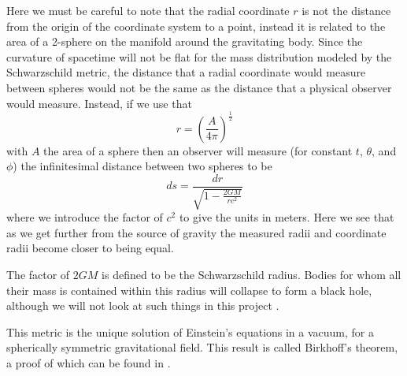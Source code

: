 Here we must be careful to note that the radial coordinate \(r\) is not the distance from the origin of the coordinate system to a point, instead it is related to the area of a 2-sphere on the manifold around the gravitating body. Since the curvature of spacetime will not be flat for the mass distribution modeled by the Schwarzschild metric, the distance that a radial coordinate would measure between spheres would not be the same as the distance that a physical observer would measure. Instead, if we use that \cite{hartle}
\begin{equation} \label{schwarzschild-radial}
	r = \left(\frac{A}{4 \pi}\right)^{\frac{1}{2}}
\end{equation}
with \(A\) the area of a sphere then an observer will measure (for constant \(t\), \(\theta\), and \(\phi\)) the infinitesimal distance between two spheres to be
\begin{equation} \label{sphere-distance}
	ds = \frac{dr}{\sqrt{1 - \frac{2 G M}{r c^2}}}
\end{equation}
where we introduce the factor of \(c^2\) to give the units in meters. Here we see that as we get further from the source of gravity the measured radii and coordinate radii become closer to being equal.

The factor of \(2GM\) is defined to be the Schwarzschild radius. Bodies for whom all their mass is contained within this radius will collapse to form a black hole, although we will not look at such things in this project \cite{cheng, carroll}.

This metric is the unique solution of Einstein's equations in a vacuum, for a spherically symmetric gravitational field. This result is called Birkhoff's theorem, a proof of which can be found in \cite{carroll}.  